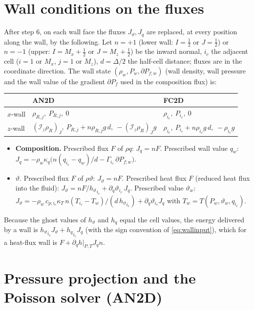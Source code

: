 \documentclass[11pt,a4paper]{article}
\newcommand{\vt}{\vartheta}                    %
\newcommand{\hth}{{h_{\vartheta}}}               %
\newcommand{\hq}{{h_q}}                          %
\newcommand{\Iz}{\mathcal{I}_z}
\begin{document}
\section{Wall conditions on the fluxes}\label{sec:wallflux}
After step 6, on each wall face the fluxes $J_\vt,J_q$ are replaced, at every position along the wall, by the following. Let $n=+1$ (lower wall: $I=\tfrac12$ or $J=\tfrac12$) or $n=-1$ (upper: $I=M_x+\tfrac12$ or $J=M_z+\tfrac12$) be the inward normal, $i_c$ the adjacent cell ($i=1$ or $M_x$, $j=1$ or $M_z$), $d=\Delta/2$ the half-cell distance; fluxes are in the coordinate direction. The wall state $(\rho_w,P_w,\partial P_{f;w})$ (wall density, wall pressure and the wall value of the gradient $\partial P_f$ used in the composition flux) is:
\begin{center}\small
\begin{tabular}{lll}
\hline
 & AN2D & FC2D \\ \hline
$x$-wall & $\rho_{R,j},\ P_{R,j},\ 0$ & $\rho_{i_c},\ P_{i_c},\ 0$ \\
$z$-wall & $(\Iz\rho_R)_J,\ P_{R,j}+n\rho_{R,j}g\,d,\ -(\Iz\rho_R)_Jg$ & $\rho_{i_c},\ P_{i_c}+n\rho_{i_c}g\,d,\ -\rho_{i_c}g$ \\ \hline
\end{tabular}
\end{center}
\begin{itemize}
  \item \textbf{Composition.} Prescribed flux $F$ of $\rho q$: $J_q=nF$. Prescribed wall value $q_w$: $J_q=-\rho_w\kappa_q\big(n(q_{i_c}-q_w)/d-\Gamma_{i_c}\,\partial P_{f;w}\big)$.
  \item $\vt$. Prescribed flux $F$ of $\rho\vt$: $J_\vt=nF$. Prescribed heat flux $F$ (reduced heat flux into the fluid): $J_\vt=nF/\hth_{i_c}+\partial_q\vt_{i_c}\,J_q$. Prescribed value $\vt_w$:
  $J_\vt=-\rho_w\,c_{p;i_c}\kappa_T\,n(T_{i_c}-T_w)/(d\,\hth_{i_c})+\partial_q\vt_{i_c}J_q$ with $T_w=T(P_w,\vt_w,q_{i_c})$.
\end{itemize}
Because the ghost values of $\hth$ and $\hq$ equal the cell values, the energy delivered by a wall is $\hth_{i_c}J_\vt+\hq_{i_c}J_q$ (with the sign convention of \eqref{eq:wallinput}), which for a heat-flux wall is $F+\partial_qh|_{P,T}J_qn$.

\section{Pressure projection and the Poisson solver (AN2D)}\label{sec:poisson}
\end{document}
